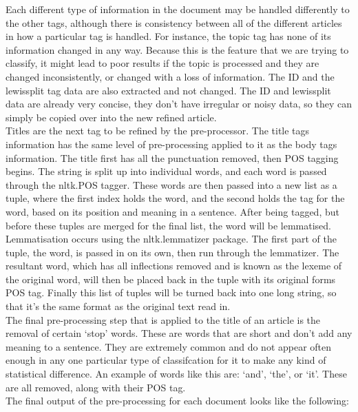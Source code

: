 \documentclass[11pt]{article}
\begin{document}
Each different type of information in the document may be handled differently to the other tags, although there is consistency between all of the different articles in how a particular tag is handled. For instance, the topic tag has none of its information changed in any way. Because this is the feature that we are trying to classify, it might lead to poor results if the topic is processed and they are changed inconsistently, or changed with a loss of information. The ID and the lewissplit tag data are also extracted and not changed. The ID and lewissplit data are already very concise, they don't have irregular or noisy data, so they can simply be copied over into the new refined article. \\

Titles are the next tag to be refined by the pre-processor. The title tags information has the same level of pre-processing applied to it as the body tags information. The title first has all the punctuation removed, then POS tagging begins. The string is split up into individual words, and each word is passed through the nltk.POS tagger. These words are then passed into a new list as a tuple, where the first index holds the word, and the second holds the tag for the word, based on its position and meaning in a sentence. After being tagged, but before these tuples are merged for the final list, the word will be lemmatised. \\

Lemmatisation occurs using the nltk.lemmatizer package. The first part of the tuple, the word, is passed in on its own, then run through the lemmatizer. The resultant word, which has all inflections removed and is known as the lexeme of the original word, will then be placed back in the tuple with its original forms POS tag. Finally this list of tuples will be turned back into one long string, so that it’s the same format as the original text read in. \\

The final pre-processing step that is applied to the title of an article is the removal of certain ‘stop’ words. These are words that are short and don’t add any meaning to a sentence. They are extremely common and do not appear often enough in any one particular type of classifcation for it to make any kind of statistical difference. An example of words like this are: ‘and’, ‘the’, or ‘it’. These are all removed, along with their POS tag. \\

The final output of the pre-processing for each document looks like the following:
\end{document}
